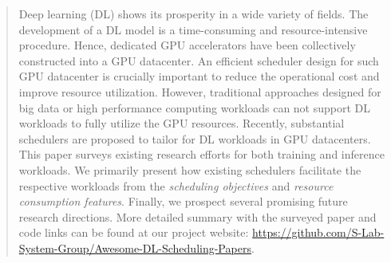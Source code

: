 \begin{abstract}
    Deep learning (DL) shows its prosperity in a wide variety of fields. The development of a DL model is a time-consuming and resource-intensive procedure. Hence, dedicated GPU accelerators have been collectively constructed into a GPU datacenter. An efficient scheduler design for such GPU datacenter is crucially important to reduce the operational cost and improve resource utilization. However, traditional approaches designed for big data or high performance computing workloads can not support DL workloads to fully utilize the GPU resources. Recently, substantial schedulers are proposed to tailor for DL workloads in GPU datacenters. This paper surveys existing research efforts for both training and inference workloads. We primarily present how existing schedulers facilitate the respective workloads from the \textit{scheduling objectives} and \textit{resource consumption features}. Finally, we prospect several promising future research directions. More detailed summary with the surveyed paper and code links can be found at our project website: \url{https://github.com/S-Lab-System-Group/Awesome-DL-Scheduling-Papers}.

\end{abstract}

